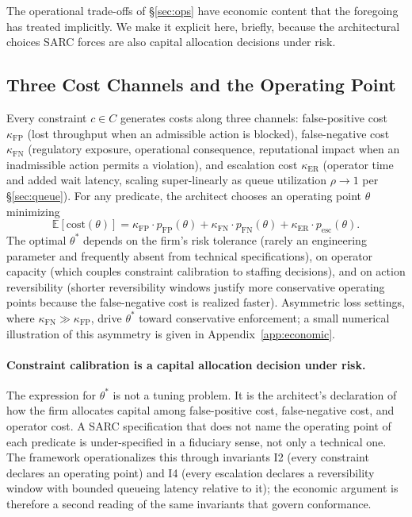 \documentclass[11pt,a4paper]{article}
\theoremstyle{remark}
\begin{document}
The operational trade-offs of \S\ref{sec:ops} have economic content that the foregoing has treated implicitly. We make it explicit here, briefly, because the architectural choices SARC forces are also capital allocation decisions under risk.

\subsection{Three Cost Channels and the Operating Point}

Every constraint $c \in C$ generates costs along three channels: false-positive cost $\kappa_{\text{FP}}$ (lost throughput when an admissible action is blocked), false-negative cost $\kappa_{\text{FN}}$ (regulatory exposure, operational consequence, reputational impact when an inadmissible action permits a violation), and escalation cost $\kappa_{\text{ER}}$ (operator time and added wait latency, scaling super-linearly as queue utilization $\rho \to 1$ per \S\ref{sec:queue}). For any predicate, the architect chooses an operating point $\theta$ minimizing
\[
    \mathbb{E}[\text{cost}(\theta)] = \kappa_{\text{FP}} \cdot p_{\text{FP}}(\theta) + \kappa_{\text{FN}} \cdot p_{\text{FN}}(\theta) + \kappa_{\text{ER}} \cdot p_{\text{esc}}(\theta).
\]
The optimal $\theta^*$ depends on the firm's risk tolerance (rarely an engineering parameter and frequently absent from technical specifications), on operator capacity (which couples constraint calibration to staffing decisions), and on action reversibility (shorter reversibility windows justify more conservative operating points because the false-negative cost is realized faster). Asymmetric loss settings, where $\kappa_{\text{FN}} \gg \kappa_{\text{FP}}$, drive $\theta^*$ toward conservative enforcement; a small numerical illustration of this asymmetry is given in Appendix~\ref{app:economic}.

\paragraph{Constraint calibration is a capital allocation decision under risk.} The expression for $\theta^*$ is not a tuning problem. It is the architect's declaration of how the firm allocates capital among false-positive cost, false-negative cost, and operator cost. A SARC specification that does not name the operating point of each predicate is under-specified in a fiduciary sense, not only a technical one. The framework operationalizes this through invariants I2 (every constraint declares an operating point) and I4 (every escalation declares a reversibility window with bounded queueing latency relative to it); the economic argument is therefore a second reading of the same invariants that govern conformance.
\end{document}
